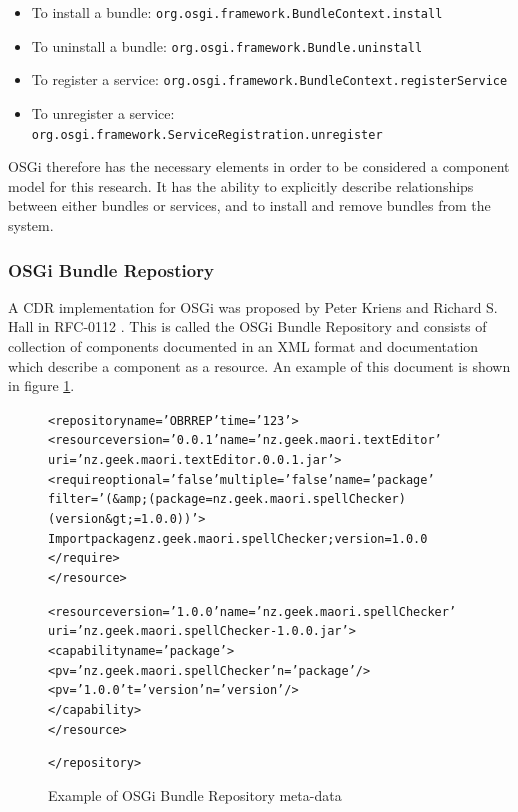\begin{itemize}
  \item To install a bundle: \verb+org.osgi.framework.BundleContext.install+
  \item To uninstall a bundle: \verb+org.osgi.framework.Bundle.uninstall+
  \item To register a service: \verb+org.osgi.framework.BundleContext.registerService+
  \item To unregister a service: \verb+org.osgi.framework.ServiceRegistration.unregister+
\end{itemize}

OSGi therefore has the necessary elements in order to be considered a component model for this research. 
It has the ability to explicitly describe relationships between either bundles or services, and to install and remove bundles from the system.

\subsubsection{OSGi Bundle Repostiory}
A CDR implementation for OSGi was proposed by Peter Kriens and Richard S. Hall in RFC-0112 \cite{the_osgi_alliance_rfc-0112_2006}.
This is called the OSGi Bundle Repository and consists of collection of components documented in an XML format and documentation which describe a component as a resource.
An example of this document is shown in figure \ref{obrmetadata}.

\begin{figure}[htp]
\begin{center}
\begin{alltt}
<repository name='OBR REP' time='123'> 
  <resource version='0.0.1' name='nz.geek.maori.textEditor' 
  uri='nz.geek.maori.textEditor.0.0.1.jar'> 
    <require optional='false'  multiple='false'  name='package' 
        filter='(&amp;(package=nz.geek.maori.spellChecker)(version&gt;=1.0.0))'> 
      Import package nz.geek.maori.spellChecker ;version=1.0.0 
    </require> 
  </resource> 

  <resource version='1.0.0' name='nz.geek.maori.spellChecker' 
  uri='nz.geek.maori.spellChecker-1.0.0.jar'> 
    <capability name='package'> 
      <p v='nz.geek.maori.spellChecker' n='package'/> 
      <p v='1.0.0' t='version' n='version'/> 
    </capability> 
  </resource> 

</repository>
\end{alltt}
  \caption[OSGi Bundle Repository markup example]{Example of OSGi Bundle Repository meta-data}
  \label{obrmetadata}
\end{center}
\end{figure}

